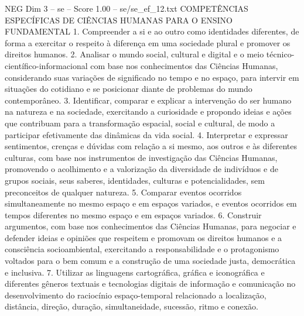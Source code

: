 \begin{textsample}{NEG Dim 3 – se – Score 1.00 – se/se\_ef\_12.txt}  \label{ex:f3_neg_125}
COMPETÊNCIAS ESPECÍFICAS DE CIÊNCIAS HUMANAS PARA O ENSINO FUNDAMENTAL 1.
Compreender a si e ao outro como identidades diferentes, de forma a exercitar o respeito à diferença em uma sociedade plural e promover os direitos humanos. 2.
Analisar o mundo social, cultural e digital e o meio técnico-científico-informacional com base nos conhecimentos das Ciências Humanas, considerando suas variações de significado no tempo e no espaço, para intervir em situações do cotidiano e se posicionar diante de problemas do mundo contemporâneo. 3.
Identificar, comparar e explicar a intervenção do ser humano na natureza e na sociedade, exercitando a curiosidade e propondo ideias e ações que contribuam para a transformação espacial, social e cultural, de modo a participar efetivamente das dinâmicas da vida social. 4.
Interpretar e expressar sentimentos, crenças e dúvidas com relação a si mesmo, aos outros e às diferentes culturas, com base nos instrumentos de investigação das Ciências Humanas, promovendo o acolhimento e a valorização da diversidade de indivíduos e de grupos sociais, seus saberes, identidades, culturas e potencialidades, sem preconceitos de qualquer natureza. 5.
Comparar eventos ocorridos simultaneamente no mesmo espaço e em espaços variados, e eventos ocorridos em tempos diferentes no mesmo espaço e em espaços variados. 6.
Construir argumentos, com base nos conhecimentos das Ciências Humanas, para negociar e defender ideias e opiniões que respeitem e promovam os direitos humanos e a consciência socioambiental, exercitando a responsabilidade e o protagonismo voltados para o bem comum e a construção de uma sociedade justa, democrática e inclusiva. 7.
Utilizar as linguagens cartográfica, gráfica e iconográfica e diferentes gêneros textuais e tecnologias digitais de informação e comunicação no desenvolvimento do raciocínio espaço-temporal relacionado a localização, distância, direção, duração, simultaneidade, sucessão, ritmo e conexão.

\end{textsample}
